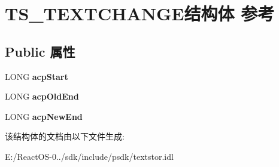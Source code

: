 \hypertarget{struct_t_s___t_e_x_t_c_h_a_n_g_e}{}\section{T\+S\+\_\+\+T\+E\+X\+T\+C\+H\+A\+N\+G\+E结构体 参考}
\label{struct_t_s___t_e_x_t_c_h_a_n_g_e}
\subsection*{Public 属性}
\begin{DoxyCompactItemize}
\item 
\mbox{\label{struct_t_s___t_e_x_t_c_h_a_n_g_e_a5db154e80e961e18cd745dbd33f225c8}} 
L\+O\+NG {\bfseries acp\+Start}
\item 
\mbox{\label{struct_t_s___t_e_x_t_c_h_a_n_g_e_ac69958bcc308bcf03f3fdbcfc02f4cad}} 
L\+O\+NG {\bfseries acp\+Old\+End}
\item 
\mbox{\label{struct_t_s___t_e_x_t_c_h_a_n_g_e_a8d61b25bf6359e98e699fa4dff9da970}} 
L\+O\+NG {\bfseries acp\+New\+End}
\end{DoxyCompactItemize}


该结构体的文档由以下文件生成\+:\begin{DoxyCompactItemize}
\item 
E\+:/\+React\+O\+S-\/0../sdk/include/psdk/textstor.\+idl\end{DoxyCompactItemize}
